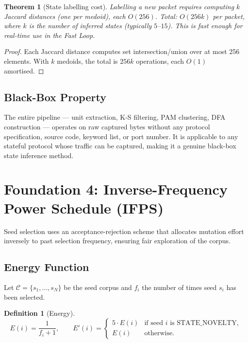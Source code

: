 \documentclass[11pt,a4paper]{article}
\newtheorem{definition}{Definition}
\newtheorem{theorem}{Theorem}
\begin{document}
\begin{theorem}[State labelling cost]
Labelling a new packet requires computing $k$ Jaccard distances (one per
medoid), each $O(256)$. Total: $O(256k)$ per packet, where $k$ is the
number of inferred states (typically $5$--$15$). This is fast enough for
real-time use in the Fast Loop.
\end{theorem}

\begin{proof}
Each Jaccard distance computes set intersection/union over at most 256
elements. With $k$ medoids, the total is $256k$ operations, each $O(1)$
amortised.
\end{proof}

\subsection{Black-Box Property}

The entire pipeline --- unit extraction, K-S filtering, PAM clustering, DFA
construction --- operates on raw captured bytes without any protocol
specification, source code, keyword list, or port number. It is applicable
to any stateful protocol whose traffic can be captured, making it a genuine
black-box state inference method.

\section{Foundation 4: Inverse-Frequency Power Schedule (IFPS)}

Seed selection uses an acceptance-rejection scheme that allocates mutation
effort inversely to past selection frequency, ensuring fair exploration of
the corpus.

\subsection{Energy Function}

Let $\mathcal{C} = \{s_1, \dots, s_N\}$ be the seed corpus and $f_i$ the
number of times seed $s_i$ has been selected.

\begin{definition}[Energy]
\[
E(i) = \frac{1}{f_i + 1},\qquad
E'(i) =
\begin{cases}
5 \cdot E(i) & \text{if seed $i$ is STATE\_NOVELTY}, \\
E(i)         & \text{otherwise}.
\end{cases}
\]
\end{definition}
\end{document}
